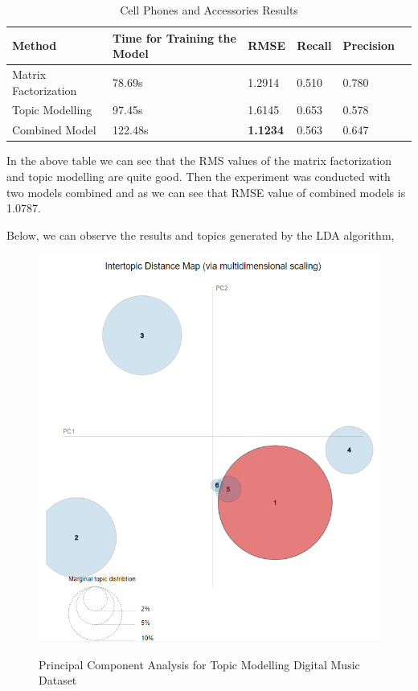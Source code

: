 \begin{table}[h]
\centering
\begin{tabular}{ llllll }
\toprule
\textbf{Method} & \textbf{Time for Training the Model} & \textbf{RMSE} & \textbf{Recall} & \textbf{Precision}  \\
\midrule
Matrix Factorization & 78.69s & 1.2914 & 0.510 & 0.780 \\
\hline
Topic Modelling & 97.45s & 1.6145 & 0.653 & 0.578 \\
\hline
Combined Model & 122.48s  & \textbf{1.1234} & 0.563 & 0.647 \\
\bottomrule        
\end{tabular}
\caption{Cell Phones and Accessories Results}\label{Cell Phones and Accessories Results}
\end{table}


In the above table we can see that the RMS values of the matrix factorization and topic modelling are quite good.
Then the experiment was conducted with two models combined and as we can see that RMSE value of combined models is 1.0787.

Below, we can observe the results and topics generated by the LDA algorithm,

\begin{figure}[H]
  {\includegraphics[width = 0.85 \textwidth]{img/lda/1.PNG}}
  \caption{Principal Component Analysis for Topic Modelling Digital Music Dataset}
\end{figure}

